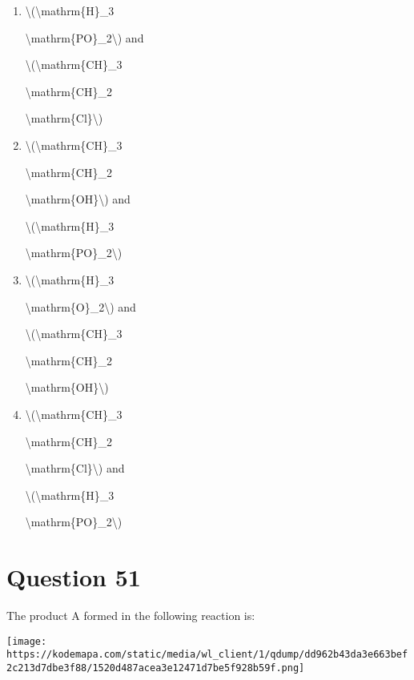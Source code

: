 \documentclass{article}
\begin{document}
\begin{enumerate}[label=(\alph*)]
\item \textbackslash(\textbackslash mathrm\{H\}\_3

\textbackslash mathrm\{PO\}\_2\textbackslash) and

\textbackslash(\textbackslash mathrm\{CH\}\_3

\textbackslash mathrm\{CH\}\_2

\textbackslash mathrm\{Cl\}\textbackslash)


\item \textbackslash(\textbackslash mathrm\{CH\}\_3

\textbackslash mathrm\{CH\}\_2

\textbackslash mathrm\{OH\}\textbackslash) and

\textbackslash(\textbackslash mathrm\{H\}\_3

\textbackslash mathrm\{PO\}\_2\textbackslash)


\item \textbackslash(\textbackslash mathrm\{H\}\_3

\textbackslash mathrm\{O\}\_2\textbackslash) and

\textbackslash(\textbackslash mathrm\{CH\}\_3

\textbackslash mathrm\{CH\}\_2

\textbackslash mathrm\{OH\}\textbackslash)


\item \textbackslash(\textbackslash mathrm\{CH\}\_3

\textbackslash mathrm\{CH\}\_2

\textbackslash mathrm\{Cl\}\textbackslash) and

\textbackslash(\textbackslash mathrm\{H\}\_3

\textbackslash mathrm\{PO\}\_2\textbackslash)


\end{enumerate}
\newpage
\section*{Question 51}
The product A formed in the following reaction is:



\texttt{[image: https://kodemapa.com/static/media/wl\_client/1/qdump/dd962b43da3e663bef2c213d7dbe3f88/1520d487acea3e12471d7be5f928b59f.png]}\\



{}\strut \\
\end{document}
